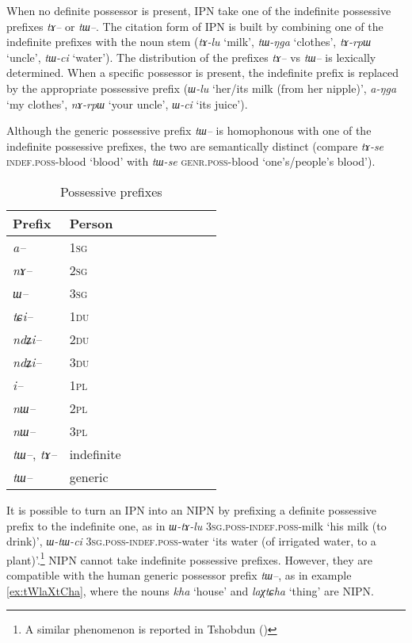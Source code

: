 \documentclass[oldfontcommands,oneside,a4paper,11pt]{article}
\newcommand{\ipa}[1]{{\phon\textit{#1}}} %
\begin{document}
When no definite possessor is present, IPN take one of the indefinite possessive prefixes \ipa{tɤ--} or \ipa{tɯ--}. The citation form of IPN is built by combining one of the indefinite prefixes with the noun stem (\ipa{tɤ-lu} `milk', \ipa{tɯ-ŋga} `clothes', \ipa{tɤ-rpɯ} `uncle', \ipa{tɯ-ci} `water'). The distribution of the prefixes \ipa{tɤ--} vs \ipa{tɯ--} is lexically determined.  When a specific possessor is present, the indefinite prefix is replaced by the appropriate possessive prefix (\ipa{ɯ-lu} `her/its milk (from her nipple)', \ipa{a-ŋga} `my clothes', \ipa{nɤ-rpɯ} `your uncle', \ipa{ɯ-ci} `its juice'). 

Although the generic possessive prefix \ipa{tɯ--} is homophonous with one of the indefinite possessive prefixes, the two are semantically distinct (compare \ipa{tɤ-se} \textsc{indef.poss}-blood `blood' with \ipa{tɯ-se} \textsc{genr.poss}-blood `one's/people's blood').

\begin{table}[h] \centering
\caption{Possessive prefixes }\label{tab:possessive}
\begin{tabular}{lllllllll} 
\toprule
 Prefix & Person\\
\midrule
\ipa{a--}  & 1\textsc{sg} \\
\ipa{nɤ--}  & 2\textsc{sg}\\
\ipa{ɯ--}  & 3\textsc{sg}\\
\midrule
\ipa{tɕi--}  &  1\textsc{du} \\
\ipa{ndʑi--}  & 2\textsc{du} \\	
\ipa{ndʑi--}  & 3\textsc{du} \\	
\midrule
\ipa{i--}  & 1\textsc{pl} \\
\ipa{nɯ--}  & 2\textsc{pl} \\
\ipa{nɯ--}  & 3\textsc{pl} \\
\midrule
\ipa{tɯ--},  \ipa{tɤ--} & indefinite \\
\ipa{tɯ--}   &  generic \\
\bottomrule
\end{tabular}
\end{table}

It is possible to turn an IPN into an NIPN by prefixing a definite possessive prefix to the indefinite one, as in \ipa{ɯ-tɤ-lu} \textsc{3sg.poss-indef.poss}-milk `his milk (to drink)', \ipa{ɯ-tɯ-ci} \textsc{3sg.poss-indef.poss}-water `its water (of irrigated water, to a plant)'.\footnote{A similar phenomenon is reported in Tshobdun (\citealt[140]{jackson98morphology})} NIPN cannot take indefinite possessive prefixes. However, they are compatible with the human generic possessor prefix \ipa{tɯ--}, as in example \ref{ex:tWlaXtCha}, where the nouns \ipa{kha} `house' and \ipa{laχtɕha} `thing' are NIPN.
\end{document}
